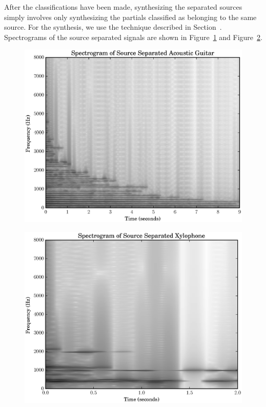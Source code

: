 After the classifications have been made, synthesizing the separated sources
simply involves only synthesizing the partials classified as belonging to the
same source. For the synthesis, we use the technique described in
Section~\label{sec:cubicphasepoly}. Spectrograms of the source separated signals
are shown in Figure~\ref{plot:acgtra3specgramss} and
Figure~\ref{plot:xylofs4specgramss}. 

\begin{figure}
    \includegraphics[width=\textwidth]{plots/ac_gtr_ss_spec.eps}
    \caption{\label{plot:acgtra3specgramss}}
\end{figure}

\begin{figure}
    \includegraphics[width=\textwidth]{plots/xylo_ss_spec.eps}
    \caption{\label{plot:xylofs4specgramss}}
\end{figure}

